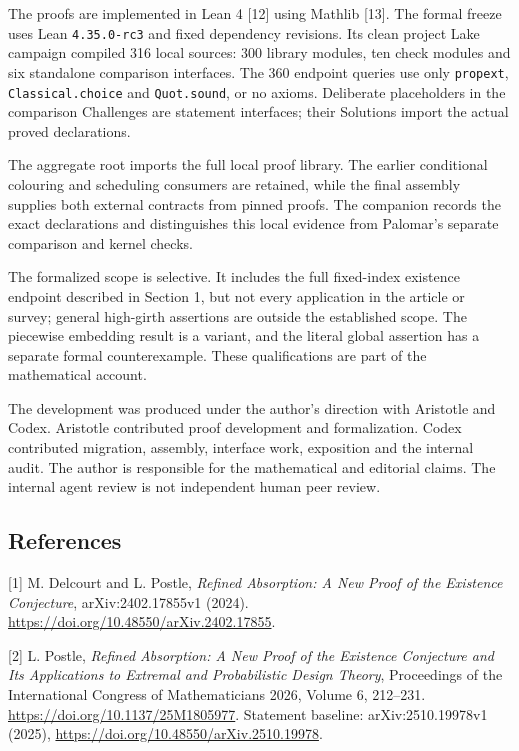\documentclass[english,11pt,a4paper]{article}
\begin{document}
The proofs are implemented in Lean 4 {[}12{]} using Mathlib {[}13{]}. The formal freeze uses Lean \texttt{4.\allowbreak{}35.\allowbreak{}0-rc3} and fixed dependency revisions. Its clean project Lake campaign compiled 316 local sources: 300 library modules, ten check modules and six standalone comparison interfaces. The 360 endpoint queries use only \texttt{propext}, \texttt{Classical.\allowbreak{}choice} and \texttt{Quot.\allowbreak{}sound}, or no axioms. Deliberate placeholders in the comparison Challenges are statement interfaces; their Solutions import the actual proved declarations.

The aggregate root imports the full local proof library. The earlier conditional colouring and scheduling consumers are retained, while the final assembly supplies both external contracts from pinned proofs. The companion records the exact declarations and distinguishes this local evidence from Palomar's separate comparison and kernel checks.

The formalized scope is selective. It includes the full fixed-index existence endpoint described in Section 1, but not every application in the article or survey; general high-girth assertions are outside the established scope. The piecewise embedding result is a variant, and the literal global assertion has a separate formal counterexample. These qualifications are part of the mathematical account.

The development was produced under the author's direction with Aristotle and Codex. Aristotle contributed proof development and formalization. Codex contributed migration, assembly, interface work, exposition and the internal audit. The author is responsible for the mathematical and editorial claims. The internal agent review is not independent human peer review.

\subsection{References}\label{references}

\begingroup\small\raggedright
\setlength{\parskip}{3pt}

{[}1{]} M. Delcourt and L. Postle, \emph{Refined Absorption: A New Proof of the Existence Conjecture}, arXiv:2402.17855v1 (2024). \url{https://doi.org/10.48550/arXiv.2402.17855}.

{[}2{]} L. Postle, \emph{Refined Absorption: A New Proof of the Existence Conjecture and Its Applications to Extremal and Probabilistic Design Theory}, Proceedings of the International Congress of Mathematicians 2026, Volume 6, 212--231. \url{https://doi.org/10.1137/25M1805977}. Statement baseline: arXiv:2510.19978v1 (2025), \url{https://doi.org/10.48550/arXiv.2510.19978}.
\end{document}
